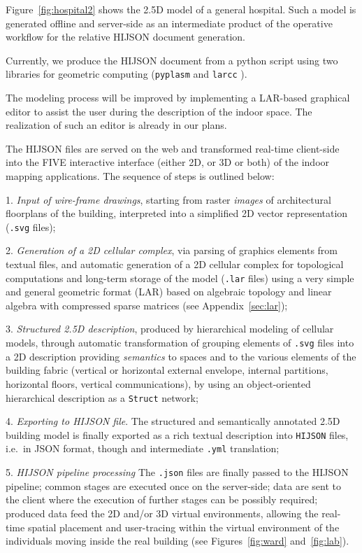 Figure~\ref{fig:hospital2} shows the 2.5D model of a general hospital. Such a
model is generated offline and server-side as an intermediate product of the
operative workflow for the relative HIJSON document generation.

Currently, we produce the HIJSON document from a python
script using two libraries for geometric computing (\texttt{pyplasm} and \texttt{larcc} \cite{Dicarlo:2014:TNL:2543138.2543294,paoluzziMS:2014,cadanda:2015}).


The modeling process will be improved by implementing a LAR-based 
graphical editor to assist the user during the description of the indoor
space. The realization of such an editor is already in our plans.


The HIJSON  files are served on the web and transformed real-time client-side into the FIVE interactive interface (either 2D, or 3D or both) of the indoor mapping applications. The sequence of steps is outlined below:

1. \textit{Input of wire-frame drawings},
  starting from   raster \emph{images} of architectural floorplans of the building, interpreted into a simplified 2D vector representation (\texttt{.svg} files);

2. \textit{Generation of a 2D cellular complex}, via
  parsing of graphics elements from textual files, and automatic generation of a 2D cellular complex for topological computations and long-term storage of the model (\texttt{.lar} files) using a very simple and general geometric format (LAR) based on algebraic topology and linear algebra with compressed sparse matrices (see Appendix~\ref{sec:lar});

3. \textit{Structured 2.5D description}, produced by
  hierarchical modeling of cellular models, through automatic transformation of grouping elements of \texttt{.svg} files into a 2D description providing \emph{semantics} to spaces and  to the various elements of the building fabric (vertical or horizontal external envelope, internal partitions, horizontal floors, vertical communications), by using an object-oriented hierarchical description as a  \texttt{Struct} network;

4. \textit{Exporting to HIJSON file}.
The  structured and semantically annotated 2.5D building model is finally  exported as a rich textual description into \texttt{HIJSON} files, i.e.~in JSON format, though and intermediate \texttt{.yml} translation;

5. \textit{HIJSON pipeline processing}   The \texttt{.json} files are finally
passed to the HIJSON pipeline;   common stages are executed once on the server-side;
data are sent to the client where the execution of further stages can be
possibly required; produced data feed the 2D and/or 3D virtual environments,
allowing the real-time spatial placement and   user-tracing within the virtual
environment of the individuals moving   inside the real building (see
Figures~\ref{fig:ward} and~\ref{fig:lab}).

